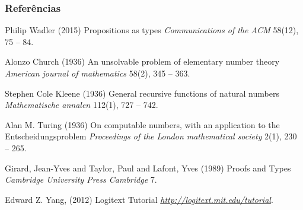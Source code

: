 \documentclass{beamer}
\begin{document}
\begin{frame}[allowframebreaks]
\frametitle{Referências}
\footnotesize{
\begin{thebibliography}{99}
 Philip Wadler (2015)
\newblock Propositions as types
\newblock \emph{Communications of the ACM} 58(12), 75 -- 84.

 Alonzo Church (1936)
\newblock An unsolvable problem of elementary number theory
\newblock \emph{American journal of mathematics} 58(2), 345 -- 363.

 Stephen Cole Kleene (1936)
\newblock General recursive functions of natural numbers
\newblock \emph{Mathematische annalen} 112(1), 727 -- 742.

 Alan M. Turing (1936)
\newblock On computable numbers, with an application to the Entscheidungsproblem
\newblock \emph{Proceedings of the London mathematical society} 2(1), 230 -- 265.

 Girard, Jean-Yves and Taylor, Paul and Lafont, Yves (1989)
\newblock Proofs and Types
\newblock \emph{Cambridge University Press Cambridge} 7.

 Edward Z. Yang, (2012)
\newblock Logitext Tutorial
\newblock \emph{\href{http://logitext.mit.edu/tutorial}{http://logitext.mit.edu/tutorial}}.

\end{thebibliography}
}
\end{frame}

\end{document}
